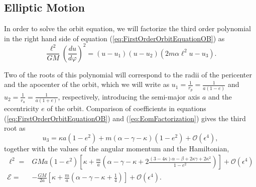 \subsection{Elliptic Motion}

In order to solve the orbit equation, we will factorize the third order polynomial in the right hand side of equation (\ref{eq:FirstOrderOrbitEquationOB}) as
\begin{equation}
\frac{\ell^2}{GM}\left( \frac{du}{d\varphi} \right)^2 = \left( u - u_1 \right)\left( u - u_2 \right)\left( 2m\alpha \ell^2 u - u_3 \right).\label{eq:EomFactorization}
\end{equation}

Two of the roots of this polynomial will correspond to the radii of the pericenter and the apocenter of the orbit, which we will write as $u_1 = \frac{1}{r_p} =\frac{1}{a(1-e)}$ and  $u_2 = \frac{1}{r_a} = \frac{1}{a(1+e)}$, respectively, introducing the semi-major axis $a$ and the eccentricity $e$ of the orbit.  Comparison of coefficients in equations (\ref{eq:FirstOrderOrbitEquationOB}) and (\ref{eq:EomFactorization}) gives the third root as 
\begin{equation}
u_3 = \kappa a (1-e^2) + m(\alpha  - \gamma - \kappa) (1-e^2) + \mathcal{O}(\epsilon^4 ),
\end{equation}
together with the values of the angular momentum and the Hamiltonian,
\begin{align}
\ell^2 = & GMa(1-e^2) \left[ \kappa + \frac{m}{a} \left( \alpha - \gamma - \kappa + 2 \frac{(3-4\kappa ) \alpha - \beta + 2\kappa \gamma +2 \kappa^2}{1-e^2}  \right)  \right] + \mathcal{O} (\epsilon^4 ) \label{eq:angularMomentumOB2}\\
\mathcal{E} = & - \frac{GM}{2a} \left[ \kappa + \frac{m}{a} \left( \alpha - \gamma -\kappa + \frac{1}{4} \right)  \right]+ \mathcal{O} (\epsilon^4 ). \label{eq:HamiltonianOB2}
\end{align}

